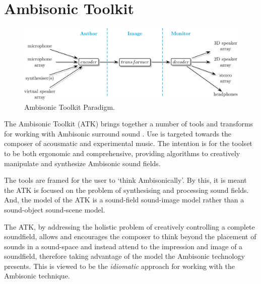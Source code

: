 \documentclass{article}
\begin{document}
\section{Ambisonic Toolkit}\label{sec:atk}

\begin{figure}[t]
\captionsetup{aboveskip=-6pt}
\centering
\includegraphics[width=2.0\columnwidth]{figures/atk-network.png}
\setlength{\abovecaptionskip}{0pt plus 3pt minus 2pt} %
\caption{Ambisonic Toolkit Paradigm.\label{fig:atkParadigm}}
\end{figure}


The Ambisonic Toolkit (ATK) brings together a number of tools and transforms for working with Ambisonic surround sound  \cite{Anderson:2009introducingATK, anderson:ambisonic_2011}.
Use is targeted towards the composer of acousmatic and experimental music. The intention is for the toolset to be both ergonomic and comprehensive, providing algorithms to creatively manipulate and synthesize Ambisonic sound fields.

The tools are framed for the user to `think Ambisonically'. By this, it is meant the ATK is focused on the problem of synthesising and processing sound fields. And, the model of the ATK is a sound-field sound-image model rather than a sound-object sound-scene model. 


The ATK, by addressing the holistic problem of creatively controlling a complete soundfield, allows and encourages the composer to think beyond the placement of sounds in a sound-space and instead attend to the impression and image of a soundfield, therefore taking advantage of the model the Ambisonic technology presents.
This is viewed to be the {\em idiomatic} approach for working with the Ambisonic technique.
\end{document}
